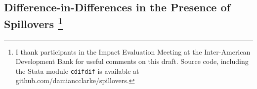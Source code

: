 \documentclass{report}[12pt]
\let\stdsection\thesection
\let\oldchapter\chapter
\renewcommand{\chapter}{\let\thesection\stdsection\oldchapter}
\begin{document}
\begin{spacing}{1.4}



\setlength\parindent{0.25in}
\setlength\parskip{0.25in}
\renewcommand*{\thefootnote}{\fnsymbol{footnote}}
\chapter[Difference-in-Differences in the Presence of Spillovers]%
{Difference-in-Differences in the Presence of Spillovers%
\footnote{I thank participants in the Impact Evaluation Meeting at the 
Inter-American Development Bank for useful comments on this draft. Source code, 
including the Stata module \texttt{cdifdif} is available at 
github.com/damiancclarke/spillovers.}}
\label{chap:spill}
\renewcommand*{\thefootnote}{\arabic{footnote}}




\end{spacing}
\newpage

\end{document}
